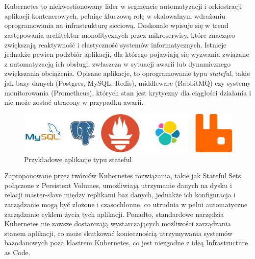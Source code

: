 \documentclass[polish]{aghengthesis}
\author{Dominika Bocheńczyk\\Mateusz Łopaciński\\Piotr Magiera\\Michał Wójcik}
\date{\the\year}
\begin{document}
\maketitle

\tableofcontents

\chapter{\ChapterTitleIntroduction}
\label{sec:wprowadzenie}

Kubernetes to niekwestionowany lider w segmencie automatyzacji i orkiestracji aplikacji kontenerowych, pełniąc kluczową rolę w skalowalnym wdrażaniu oprogramowania na infrastrukturę sieciową. Doskonale wpisuje się w trend zastępowania architektur monolitycznych przez mikroserwisy, które znacząco zwiększają reaktywność i elastyczność systemów informatycznych. Istnieje jednakże pewien podzbiór aplikacji, dla którego pojawiają się wyzwania związane z automatyzacją ich obsługi, zwłaszcza w sytuacji awarii lub dynamicznego zwiększania obciążenia. Opisane aplikacje, to oprogramowanie typu \textit{stateful}, takie jak bazy danych (Postgres, MySQL, Redis), middleware (RabbitMQ) czy systemy monitorowania (Prometheus), których stan jest krytyczny dla ciągłości działania i nie może zostać utracony w przypadku awarii.

\begin{figure}[h!]
    \centering
    \includegraphics[width=1\linewidth]{documentation/resources/stateful_apps.png}
    \caption{Przykładowe aplikacje typu stateful}
    \label{fig:stateful}
\end{figure}

Zaproponowane przez twórców Kubernetes rozwiązania, takie jak Stateful Sets połączone z Persistent Volumes, umożliwiają utrzymanie danych na dysku i relacji master-slave między replikami baz danych, jednakże ich konfiguracja i zarządzanie mogą być złożone i czasochłonne, co utrudnia w pełni automatyczne zarządzanie cyklem życia tych aplikacji. Ponadto, standardowe narzędzia Kubernetes nie zawsze dostarczają wystarczających możliwości zarządzania stanem aplikacji, co może skutkować koniecznością utrzymywania systemów bazodanowych poza klastrem Kubernetes, co jest niezgodne z ideą Infrastructure as Code.
\end{document}
